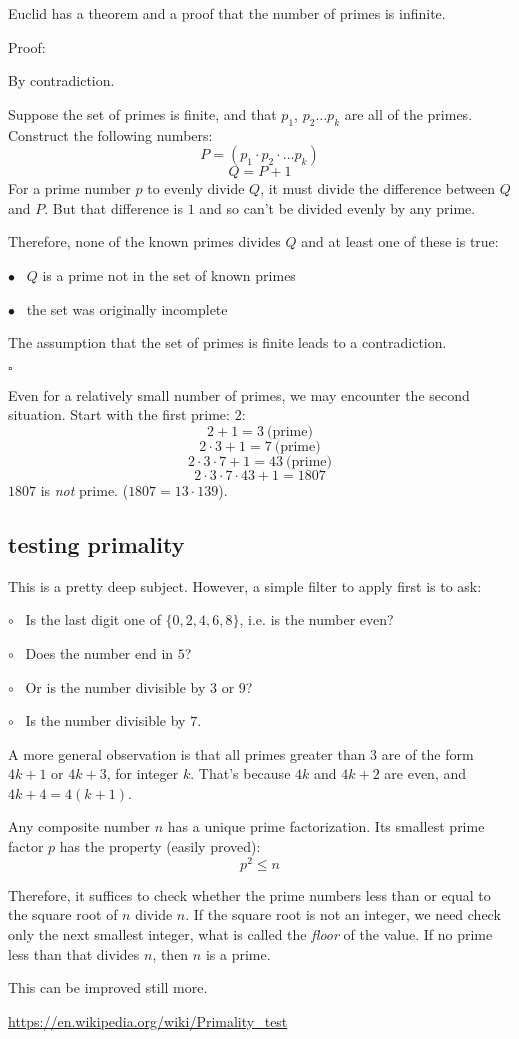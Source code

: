 \documentclass[11pt, oneside]{article}
\begin{document}
Euclid has a theorem and a proof that the number of primes is infinite.

Proof:

By contradiction.

Suppose the set of primes is finite, and that $p_1$, $p_2 \dots p_k$ are all of the primes.  Construct the following numbers:
\[ P = (p_1 \cdot p_2 \cdot \dots p_k)  \]
\[ Q = P + 1 \]
For a prime number $p$ to evenly divide $Q$, it must divide the difference between $Q$ and $P$.  But that difference is $1$ and so can't be divided evenly by any prime.

Therefore, none of the known primes divides $Q$ and at least one of these is true:

$\bullet$ \  $Q$ is a prime not in the set of known primes

$\bullet$ \ the set was originally incomplete

The assumption that the set of primes is finite leads to a contradiction.

$\square$

Even for a relatively small number of primes, we may encounter the second situation.  Start with the first prime:  $2$:
\[ 2 + 1 = 3 \ \text{(prime)} \]
\[ 2 \cdot 3 + 1 = 7 \ \text{(prime)}  \]
\[ 2 \cdot 3 \cdot 7 +1 = 43 \ \text{(prime)}  \]
\[ 2 \cdot 3 \cdot 7 \cdot 43 + 1 =  1807 \]
$1807$ is \emph{not} prime.  ($1807 = 13 \cdot 139$).

\subsection*{testing primality}
This is a pretty deep subject.  However, a simple filter to apply first is to ask:  

$\circ$ \ Is the last digit one of $\{ 0,2,4,6,8 \}$, i.e. is the number even?  

$\circ$ \ Does the number end in $5$?  

$\circ$ \ Or is the number divisible by $3$ or $9$?

$\circ$ \ Is the number divisible by $7$.

A more general observation is that all primes greater than $3$ are of the form $4k + 1$ or $4k + 3$, for integer $k$.  That's because $4k$ and $4k + 2$ are even, and $4k + 4 = 4(k + 1)$.

Any composite number $n$ has a unique prime factorization.  Its smallest prime factor $p$ has the property (easily proved):
\[ p^2 \le n \]

Therefore, it suffices to check whether the prime numbers less than or equal to the square root of $n$ divide $n$.  If the square root is not an integer, we need check only the next smallest integer, what is called the \emph{floor} of the value.  If no prime less than that divides $n$, then $n$ is a prime.

This can be improved still more.

\url{https://en.wikipedia.org/wiki/Primality_test}
\end{document}
